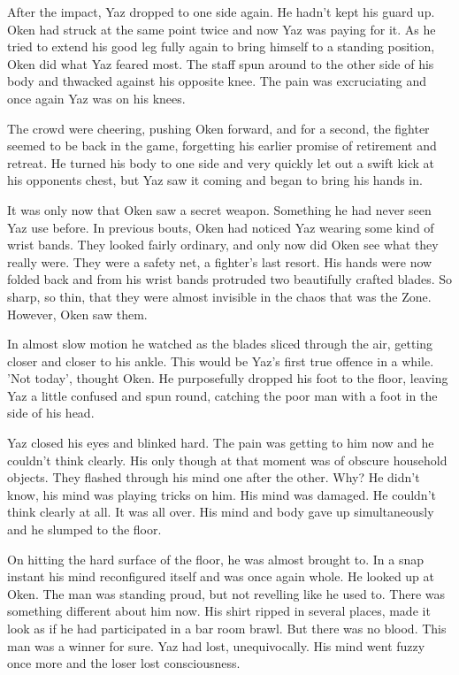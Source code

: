 After the impact, Yaz dropped to one side again.  He hadn't kept his guard up.  Oken had struck at the same point twice and now Yaz was paying for it.  As he tried to extend his good leg fully again to bring himself to a standing position, Oken did what Yaz feared most.  The staff spun around to the other side of his body and thwacked against his opposite knee.  The pain was excruciating and once again Yaz was on his knees.  

The crowd were cheering, pushing Oken forward, and for a second, the fighter seemed to be back in the game, forgetting his earlier promise of retirement and retreat.  He turned his body to one side and very quickly let out a swift kick at his opponents chest, but Yaz saw it coming and began to bring his hands in.

It was only now that Oken saw a secret weapon.  Something he had never seen Yaz use before.  In previous bouts, Oken had noticed Yaz wearing some kind of wrist bands.  They looked fairly ordinary, and only now did Oken see what they really were.  They were a safety net, a fighter's last resort.  His hands were now folded back and from his wrist bands protruded two beautifully crafted blades.  So sharp, so thin, that they were almost invisible in the chaos that was the Zone.  However, Oken saw them.  

In almost slow motion he watched as the blades sliced through the air, getting closer and closer to his ankle.  This would be Yaz's first true offence in a while.  'Not today', thought Oken.  He purposefully dropped his foot to the floor, leaving Yaz a little confused and spun round, catching the poor man with a foot in the side of his head.

Yaz closed his eyes and blinked hard.  The pain was getting to him now and he couldn't think clearly.  His only though at that moment was of obscure household objects.  They flashed through his mind one after the other.  Why?  He didn't know, his mind was playing tricks on him.  His mind was damaged.  He couldn't think clearly at all.  It was all over.  His mind and body gave up simultaneously and he slumped to the floor.  

On hitting the hard surface of the floor, he was almost brought to.  In a snap instant his mind reconfigured itself and was once again whole.  He looked up at Oken.  The man was standing proud, but not revelling like he used to.  There was something different about him now.  His shirt ripped in several places, made it look as if he had participated in a bar room brawl.  But there was no blood.  This man was a winner for sure.  Yaz had lost, unequivocally.  His mind went fuzzy once more and the loser lost consciousness. 

